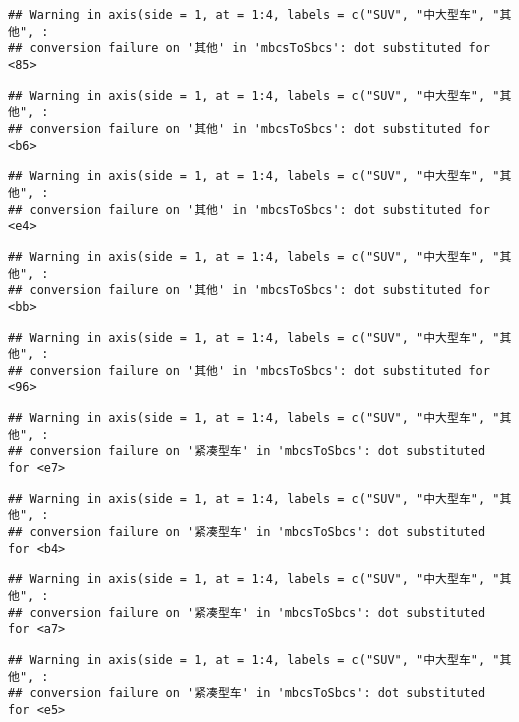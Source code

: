 \documentclass[]{article}
\begin{document}
\begin{verbatim}
## Warning in axis(side = 1, at = 1:4, labels = c("SUV", "中大型车", "其他", :
## conversion failure on '其他' in 'mbcsToSbcs': dot substituted for <85>
\end{verbatim}

\begin{verbatim}
## Warning in axis(side = 1, at = 1:4, labels = c("SUV", "中大型车", "其他", :
## conversion failure on '其他' in 'mbcsToSbcs': dot substituted for <b6>
\end{verbatim}

\begin{verbatim}
## Warning in axis(side = 1, at = 1:4, labels = c("SUV", "中大型车", "其他", :
## conversion failure on '其他' in 'mbcsToSbcs': dot substituted for <e4>
\end{verbatim}

\begin{verbatim}
## Warning in axis(side = 1, at = 1:4, labels = c("SUV", "中大型车", "其他", :
## conversion failure on '其他' in 'mbcsToSbcs': dot substituted for <bb>
\end{verbatim}

\begin{verbatim}
## Warning in axis(side = 1, at = 1:4, labels = c("SUV", "中大型车", "其他", :
## conversion failure on '其他' in 'mbcsToSbcs': dot substituted for <96>
\end{verbatim}

\begin{verbatim}
## Warning in axis(side = 1, at = 1:4, labels = c("SUV", "中大型车", "其他", :
## conversion failure on '紧凑型车' in 'mbcsToSbcs': dot substituted for <e7>
\end{verbatim}

\begin{verbatim}
## Warning in axis(side = 1, at = 1:4, labels = c("SUV", "中大型车", "其他", :
## conversion failure on '紧凑型车' in 'mbcsToSbcs': dot substituted for <b4>
\end{verbatim}

\begin{verbatim}
## Warning in axis(side = 1, at = 1:4, labels = c("SUV", "中大型车", "其他", :
## conversion failure on '紧凑型车' in 'mbcsToSbcs': dot substituted for <a7>
\end{verbatim}

\begin{verbatim}
## Warning in axis(side = 1, at = 1:4, labels = c("SUV", "中大型车", "其他", :
## conversion failure on '紧凑型车' in 'mbcsToSbcs': dot substituted for <e5>
\end{verbatim}
\end{document}
